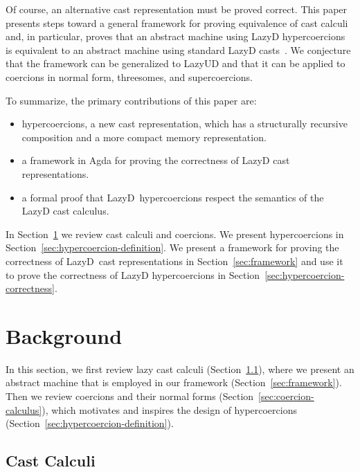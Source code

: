 \documentclass[acmsmall,review,anonymous]{acmart}\settopmatter{printfolios=true,printccs=false,printacmref=false}
\newcommand{\lazyUD}{Lazy\;UD}
\newcommand{\lazyD}{Lazy\;D}
\begin{document}
Of course, an alternative cast representation must be proved
correct. This paper presents steps toward a general framework for
proving equivalence of cast calculi and, in particular, proves that an
abstract machine using \lazyD{} hypercoercions is equivalent to an
abstract machine using standard \lazyD{}
casts~\citep{siek2009exploring}. We conjecture that the framework can
be generalized to \lazyUD{} and that it can be applied to coercions in
normal form, threesomes, and supercoercions.

To summarize, the primary contributions of this paper are:
\begin{itemize}
\item hypercoercions, a new cast representation, which
  has a structurally recursive composition and a more compact memory
  representation.
\item a framework in Agda for proving the correctness of \lazyD{} cast
  representations.
\item a formal proof that \lazyD\ hypercoercions respect the semantics
  of the \lazyD{} cast calculus.
\end{itemize}

In Section~\ref{sec:background} we review cast calculi and coercions. 
We present hypercoercions in
Section~\ref{sec:hypercoercion-definition}.  We present a framework
for proving the correctness of \lazyD\ cast representations in
Section~\ref{sec:framework} and use it to prove the correctness of
\lazyD{} hypercoercions in
Section~\ref{sec:hypercoercion-correctness}.

\section{Background} \label{sec:background}

In this section, we first review lazy cast calculi
(Section~\ref{sec:cast-calculi}), where we present an abstract machine that is 
employed in our framework (Section~\ref{sec:framework}). Then we review 
coercions and their normal forms (Section~\ref{sec:coercion-calculus}), which 
motivates and inspires the design of hypercoercions 
(Section~\ref{sec:hypercoercion-definition}).

\subsection{Cast Calculi}
\label{sec:cast-calculi}
\end{document}
